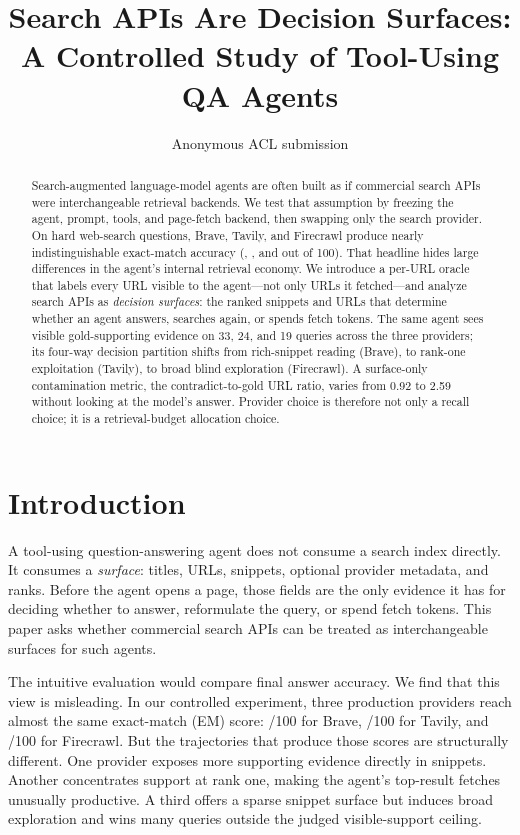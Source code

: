 \documentclass[11pt]{article}
\title{Search APIs Are Decision Surfaces: A Controlled Study of Tool-Using QA Agents}
\author{Anonymous ACL submission}
\begin{document}
\maketitle

\begin{abstract}
Search-augmented language-model agents are often built as if commercial search APIs were interchangeable retrieval backends. We test that assumption by freezing the agent, prompt, tools, and page-fetch backend, then swapping only the search provider. On \NQueries{} hard web-search questions, Brave, Tavily, and Firecrawl produce nearly indistinguishable exact-match accuracy (\BraveEM{}, \TavilyEM{}, and \FirecrawlEM{} out of 100). That headline hides large differences in the agent's internal retrieval economy. We introduce a per-URL oracle that labels every URL visible to the agent---not only URLs it fetched---and analyze search APIs as \emph{decision surfaces}: the ranked snippets and URLs that determine whether an agent answers, searches again, or spends fetch tokens. The same agent sees visible gold-supporting evidence on 33, 24, and 19 queries across the three providers; its four-way decision partition shifts from rich-snippet reading (Brave), to rank-one exploitation (Tavily), to broad blind exploration (Firecrawl). A surface-only contamination metric, the contradict-to-gold URL ratio, varies from 0.92 to 2.59 without looking at the model's answer. Provider choice is therefore not only a recall choice; it is a retrieval-budget allocation choice.
\end{abstract}

\section{Introduction}

A tool-using question-answering agent does not consume a search index directly. It consumes a \emph{surface}: titles, URLs, snippets, optional provider metadata, and ranks. Before the agent opens a page, those fields are the only evidence it has for deciding whether to answer, reformulate the query, or spend fetch tokens. This paper asks whether commercial search APIs can be treated as interchangeable surfaces for such agents.

The intuitive evaluation would compare final answer accuracy. We find that this view is misleading. In our controlled experiment, three production providers reach almost the same exact-match (EM) score: \BraveEM{}/100 for Brave, \TavilyEM{}/100 for Tavily, and \FirecrawlEM{}/100 for Firecrawl. But the trajectories that produce those scores are structurally different. One provider exposes more supporting evidence directly in snippets. Another concentrates support at rank one, making the agent's top-result fetches unusually productive. A third offers a sparse snippet surface but induces broad exploration and wins many queries outside the judged visible-support ceiling.
\end{document}
